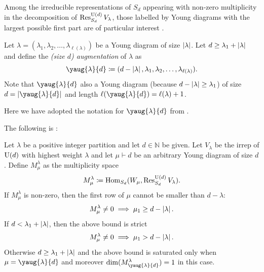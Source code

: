 \documentclass[notitlepage, 10pt]{article}
\begin{document}
Among the irreducible representations of $S_d$ appearing with non-zero multiplicity in the decomposition of $\operatorname{Res}^{\operatorname{U}(d)}_{S_d} V_{\lambda}$, those labelled by Young diagrams with the largest possible first part are of particular interest \cite{christandl2018recoupling}.
\begin{defn}
    Let $\lambda = (\lambda_1, \lambda_2, \ldots, \lambda_{\ell(\lambda)})$ be a Young diagram of size $\left|\lambda\right|$.
    Let $d \geq \lambda_1 + \left|\lambda\right|$ and define the \textit{(size $d$) augmentation} of $\lambda$ as
    \begin{equation}
        \yaug{\lambda}{d} \coloneqq (d - \abs{\lambda}, \lambda_1, \lambda_2, \ldots, \lambda_{\ell(\lambda)}).
    \end{equation}
    Note that $\yaug{\lambda}{d}$ also a Young diagram (because $d - \left|\lambda\right| \geq \lambda_1$) of size $d = \abs{\yaug{\lambda}{d}}$ and length $\ell(\yaug{\lambda}{d}) = \ell(\lambda) + 1$.
\end{defn}
Here we have adopted the notation for $\yaug{\lambda}{d}$ from \cite{pak2022combinatorial}.

The following is \cite[Lemma 13]{christandl2018recoupling}:
\begin{lem}
    \label{lem:largest_first_rows}
    Let $\lambda$ be a positive integer partition and let $d \in \mathbb N$ be given.
    Let $V_{\lambda}$ be the irrep of $\operatorname{U}(d)$ with highest weight $\lambda$ and let $\mu \vdash d$ be an arbitrary Young diagram of size $d$.
    Define $M^{\lambda}_{\mu}$ as the multiplicity space
    \begin{equation}
        M^{\lambda}_{\mu} \coloneqq \operatorname{Hom}_{S_d}(W_{\mu}, \operatorname{Res}^{\operatorname{U}(d)}_{S_d} V_{\lambda}).
    \end{equation}
    If $M^{\lambda}_{\mu}$ is non-zero, then the first row of $\mu$ cannot be smaller than $d - \lambda$:
    \begin{equation}
        M^{\lambda}_{\mu} \neq 0 \implies \mu_1 \geq d - \left|\lambda\right|.
    \end{equation}
    If $d < \lambda_1 + \left|\lambda\right|$, then the above bound is strict
    \begin{equation}
        M^{\lambda}_{\mu} \neq 0 \implies \mu_1 > d - \left|\lambda\right|.
    \end{equation}
    Otherwise $d \geq \lambda_1 + \left|\lambda\right|$ and the above bound is saturated only when $\mu = \yaug{\lambda}{d}$ and moreover $\dim(M^{\lambda}_{\yaug{\lambda}{d}}) = 1$ in this case.
\end{lem}
\end{document}

